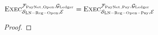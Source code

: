   \begin{lemma}
    \label{lemma:pay}
    $\textsc{Exec}^{\mathcal{F}_{\mathrm{PayNet}}{}_{\mathrm{, Open}},
    \mathcal{G}_{\mathrm{Ledger}}}_{\mathcal{S}_{\mathrm{LN - Reg - Open}}, \mathcal{E}} =
    \textsc{Exec}^{\mathcal{F}_{\mathrm{PayNet}}{}_{\mathrm{, Pay}}, \mathcal{G}_{\mathrm{Ledger}}}_{\mathcal{S}_{\mathrm{LN
    - Reg - Open - Pay}}, \mathcal{E}}$
  \end{lemma}

  \begin{proof}
  \end{proof}
